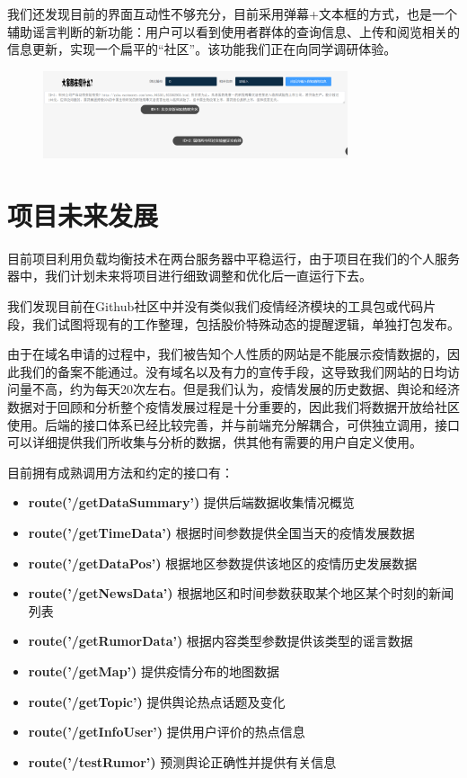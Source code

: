 \documentclass{article}
\begin{document}
我们还发现目前的界面互动性不够充分，目前采用弹幕+文本框的方式，也是一个辅助谣言判断的新功能：用户可以看到使用者群体的查询信息、上传和阅览相关的信息更新，实现一个扁平的“社区”。该功能我们正在向同学调研体验。

\begin{figure}[H]
\centering
\includegraphics[width=0.8\textwidth]{pic9.png}
\end{figure}


\section{项目未来发展}

目前项目利用负载均衡技术在两台服务器中平稳运行，由于项目在我们的个人服务器中，我们计划未来将项目进行细致调整和优化后一直运行下去。

我们发现目前在Github社区中并没有类似我们疫情经济模块的工具包或代码片段，我们试图将现有的工作整理，包括股价特殊动态的提醒逻辑，单独打包发布。

由于在域名申请的过程中，我们被告知个人性质的网站是不能展示疫情数据的，因此我们的备案不能通过。没有域名以及有力的宣传手段，这导致我们网站的日均访问量不高，约为每天20次左右。但是我们认为，疫情发展的历史数据、舆论和经济数据对于回顾和分析整个疫情发展过程是十分重要的，因此我们将数据开放给社区使用。后端的接口体系已经比较完善，并与前端充分解耦合，可供独立调用，接口可以详细提供我们所收集与分析的数据，供其他有需要的用户自定义使用。

目前拥有成熟调用方法和约定的接口有：
\begin{itemize}
	\item{\textbf{route('/getDataSummary')}} 提供后端数据收集情况概览 
	\item{\textbf{route('/getTimeData')}} 根据时间参数提供全国当天的疫情发展数据
	\item{\textbf{route('/getDataPos')}} 根据地区参数提供该地区的疫情历史发展数据
	\item{\textbf{route('/getNewsData')}} 根据地区和时间参数获取某个地区某个时刻的新闻列表
	\item{\textbf{route('/getRumorData')}} 根据内容类型参数提供该类型的谣言数据
	\item{\textbf{route('/getMap')}} 提供疫情分布的地图数据
	\item{\textbf{route('/getTopic')}} 提供舆论热点话题及变化
	\item{\textbf{route('/getInfoUser')}} 提供用户评价的热点信息
	\item{\textbf{route('/testRumor')}} 预测舆论正确性并提供有关信息
\end{itemize}
\end{document}
